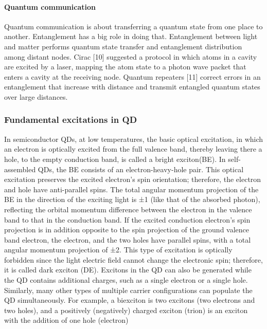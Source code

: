 \paragraph{Quantum communication}
Quantum communication is about transferring a quantum state from one place to another. Entanglement has a big role in doing that. Entanglement between light and matter performs quantum state transfer and entanglement distribution among distant nodes.  Cirac [10] suggested a protocol in which atoms in a cavity are excited by a laser, mapping the atom state to a photon wave packet that enters a cavity at the receiving node. Quantum repeaters [11] correct errors in an entanglement that increase with distance and transmit entangled quantum states over large distances.
\subsubsection{Fundamental excitations in QD}
In semiconductor QDs, at low temperatures, the basic optical excitation, in which an electron is optically excited from the full valence band, thereby leaving there a hole, to the empty conduction band, is called a bright exciton(BE). In self-assembled QDs, the BE consists of an electron-heavy-hole pair. This optical excitation preserves the excited electron's spin orientation; therefore, the electron and hole have anti-parallel spins. The total angular momentum projection of the BE in the direction of the exciting light is ±1 (like that of the absorbed photon), reflecting the orbital momentum difference between the electron in the valence band to that in the conduction band.
If the excited conduction electron's spin projection is in addition opposite to the spin projection of the ground valence band electron, the electron, and the two holes have parallel spins, with a total angular momentum projection of ±2. This type of excitation is optically forbidden since the light electric field cannot change the electronic spin; therefore, it is called dark exciton (DE). Excitons in the QD can also be generated while the QD contains additional charges, such as a single electron or a single hole. Similarly, many other types of multiple carrier configurations can populate the QD simultaneously. For example, a biexciton is two excitons (two electrons and two holes), and a positively (negatively) charged exciton (trion) is an exciton with the addition of one hole (electron) 
